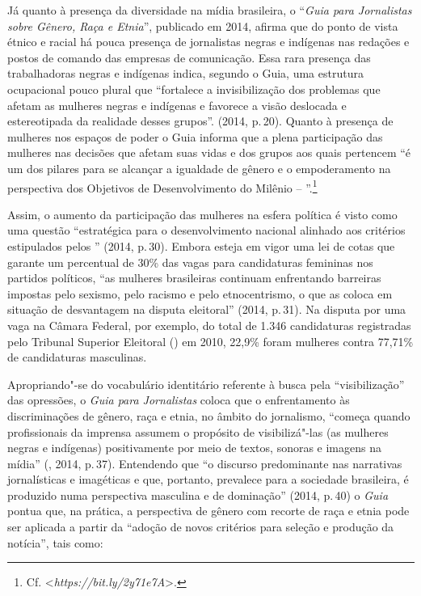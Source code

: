 Já quanto à presença da diversidade na mídia brasileira, o ``\emph{Guia
para Jornalistas sobre Gênero, Raça e Etnia}'', publicado em 2014,
afirma que do ponto de vista étnico e racial há pouca presença de
jornalistas negras e indígenas nas redações e postos de comando das
empresas de comunicação. Essa rara presença das trabalhadoras negras e
indígenas indica, segundo o Guia, uma estrutura ocupacional pouco plural
que ``fortalece a invisibilização dos problemas que afetam as mulheres
negras e indígenas e favorece a visão deslocada e estereotipada da
realidade desses grupos''. (2014, p.\,20). Quanto à presença de mulheres
nos espaços de poder o Guia informa que a plena participação das
mulheres nas decisões que afetam suas vidas e dos grupos aos quais
pertencem ``é um dos pilares para se alcançar a igualdade de gênero e o
empoderamento na perspectiva dos Objetivos de Desenvolvimento do Milênio
-- ''.\footnote{Cf. \textless{}\emph{https://bit.ly/2y71e7A}\textgreater{}.}

Assim, o aumento da participação das mulheres na esfera política é visto
como uma questão ``estratégica para o desenvolvimento nacional alinhado
aos critérios estipulados pelos '' (2014, p.\,30). Embora esteja em
vigor uma lei de cotas que garante um percentual de 30\% das vagas para
candidaturas femininas nos partidos políticos, ``as mulheres brasileiras
continuam enfrentando barreiras impostas pelo sexismo, pelo racismo e
pelo etnocentrismo, o que as coloca em situação de desvantagem na
disputa eleitoral'' (2014, p.\,31). Na disputa por uma vaga na Câmara
Federal, por exemplo, do total de 1.346 candidaturas registradas pelo
Tribunal Superior Eleitoral () em 2010, 22,9\% foram mulheres contra
77,71\% de candidaturas masculinas.

Apropriando"-se do vocabulário identitário referente à busca pela
``visibilização'' das opressões, o \emph{Guia para Jornalistas} coloca
que o enfrentamento às discriminações de gênero, raça e etnia, no âmbito
do jornalismo, ``começa quando profissionais da imprensa assumem o
propósito de visibilizá"-las (as mulheres negras e indígenas)
positivamente por meio de textos, sonoras e imagens na mídia'' (,
2014, p.\,37). Entendendo que ``o discurso predominante nas narrativas
jornalísticas e imagéticas e que, portanto, prevalece para a sociedade
brasileira, é produzido numa perspectiva masculina e de dominação''
(2014, p.\,40) o \emph{Guia} pontua que, na prática, a perspectiva de
gênero com recorte de raça e etnia pode ser aplicada a partir da
``adoção de novos critérios para seleção e produção da notícia'', tais
como:


